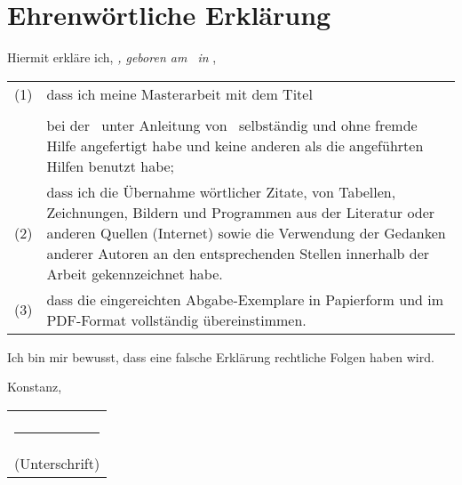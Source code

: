 \chapter*{Ehrenw\"{o}rtliche Erkl\"{a}rung}

Hiermit erkläre ich,
\textit{\authorName, geboren am \authorBirthday\ in \authorBirthdayCity},\\
\noindent
\begin{tabular}{p{}p{}}
	(1) & dass ich meine Masterarbeit mit dem Titel \\[1em]
		& \textbf{\topic} \\[1em]
		& bei der \companyName\ unter Anleitung von \proffessor\ selbständig und ohne fremde Hilfe angefertigt habe und keine anderen als die angeführten Hilfen benutzt habe;\\[1em]
	(2) & dass ich die Übernahme wörtlicher Zitate, von Tabellen, Zeichnungen, Bildern und Programmen aus der Literatur oder anderen Quellen (Internet) sowie die Verwendung der Gedanken anderer Autoren an den entsprechenden Stellen innerhalb der Arbeit gekennzeichnet habe.\\[1em]
	(3) & dass die eingereichten Abgabe-Exemplare in Papierform und im PDF-Format vollständig übereinstimmen.\\
\end{tabular}
\vspace*{1cm}

\noindent
Ich bin mir bewusst, dass eine falsche Erklärung rechtliche Folgen haben wird.
\vspace*{3cm}

\noindent
Konstanz, \closingdate\hfill \begin{tabular}{c} \\ \\ \rule{5cm}{1pt} \\ (Unterschrift)
\end{tabular}
